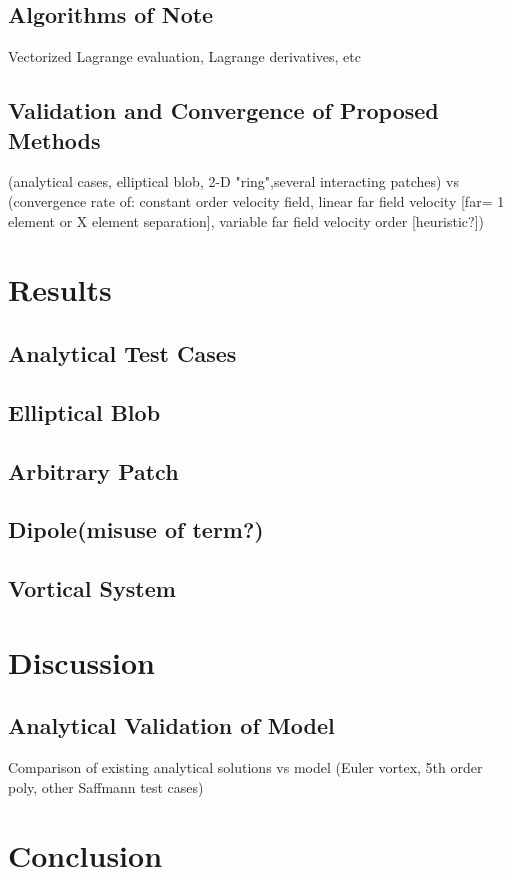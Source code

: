 \documentclass[letterpaper,12pt]{report}
\begin{document}
\subsection{Algorithms of Note}
Vectorized Lagrange evaluation, Lagrange derivatives, etc
\subsection{Validation and Convergence of Proposed Methods}
(analytical cases, elliptical blob, 2-D "ring",several interacting patches) vs (convergence rate of: constant order velocity field, linear far field velocity [far= 1 element or X element separation], variable far field velocity order [heuristic?])
\section{Results}
\subsection{Analytical Test Cases}
\subsection{Elliptical Blob}
\subsection{Arbitrary Patch}
\subsection{Dipole(misuse of term?)}
\subsection{Vortical System}
\section{Discussion}
\subsection{Analytical Validation of Model}
Comparison of existing analytical solutions vs model (Euler vortex, 5th order poly, other Saffmann test cases)
\subsection{}
\section{Conclusion}
\end{document}
